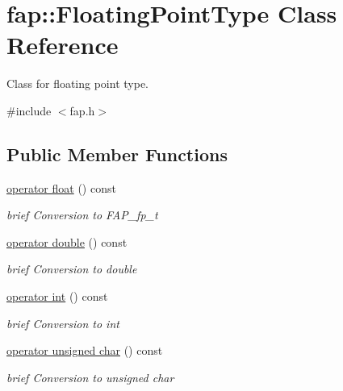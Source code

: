 \hypertarget{classfap_1_1FloatingPointType}{}\section{fap\+:\+:Floating\+Point\+Type Class Reference}
\label{classfap_1_1FloatingPointType}


Class for floating point type.  




{\ttfamily \#include $<$fap.\+h$>$}

\subsection*{Public Member Functions}
\begin{DoxyCompactItemize}
\item 
\hyperlink{classfap_1_1FloatingPointType_af4d0ebec7d0f2cff3e901a5a74a04d26}{operator float} () const
\begin{DoxyCompactList}\small\item\em brief Conversion to F\+A\+P\+\_\+fp\+\_\+t \end{DoxyCompactList}\item 
\hypertarget{classfap_1_1FloatingPointType_a7cac8cbb286a5a39a7afb475ea130db3}{}\label{classfap_1_1FloatingPointType_a7cac8cbb286a5a39a7afb475ea130db3} 
\hyperlink{classfap_1_1FloatingPointType_a7cac8cbb286a5a39a7afb475ea130db3}{operator double} () const
\begin{DoxyCompactList}\small\item\em brief Conversion to double \end{DoxyCompactList}\item 
\hypertarget{classfap_1_1FloatingPointType_ab6d80415c8b3752813362d0ec58b672a}{}\label{classfap_1_1FloatingPointType_ab6d80415c8b3752813362d0ec58b672a} 
\hyperlink{classfap_1_1FloatingPointType_ab6d80415c8b3752813362d0ec58b672a}{operator int} () const
\begin{DoxyCompactList}\small\item\em brief Conversion to int \end{DoxyCompactList}\item 
\hypertarget{classfap_1_1FloatingPointType_a206e802e7b114122b4baccd31576b0d1}{}\label{classfap_1_1FloatingPointType_a206e802e7b114122b4baccd31576b0d1} 
\hyperlink{classfap_1_1FloatingPointType_a206e802e7b114122b4baccd31576b0d1}{operator unsigned char} () const
\begin{DoxyCompactList}\small\item\em brief Conversion to unsigned char \end{DoxyCompactList}\item 

\end{DoxyCompactItemize}
